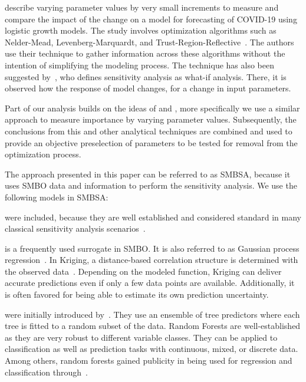 \documentclass[conference]{IEEEtran}
\renewenvironment{description}[0]{\begin{compactdesc}}{\end{compactdesc}}
\begin{document}
\citet{Ahmed20} describe varying parameter values by very small increments to measure and compare the impact of the change on a model for forecasting of COVID-19 using logistic growth models. The study involves optimization algorithms such as Nelder-Mead, Levenberg-Marquardt, and Trust-Region-Reflective~\citep{NelderM65}. The authors use their technique to gather information across these algorithms without the intention of simplifying the modeling process. 
The technique has also been suggested by~\citet{Kleijnen97}, who defines sensitivity analysis as what-if analysis.
There, it is observed how the response of model changes, for a change in input parameters. 

Part of our analysis builds on the ideas of \citet{Ahmed20} and \citet{Kleijnen97}, more specifically we use a similar approach to measure importance by varying parameter values. Subsequently, the conclusions from this and other analytical techniques are combined and used to provide an objective preselection of parameters to be tested for removal from the optimization process.

The approach presented in this paper can be referred to as \gls{SMBSA}, because it uses \gls{SMBO} data and information to perform the sensitivity analysis.
We use the following models in \gls{SMBSA}:
\begin{description}
\item[Linear regression models] were included, because they are well established and considered standard in many classical sensitivity analysis scenarios~\citep{Klei04e}.
\item[Kriging] is a frequently used surrogate in  \gls{SMBO}. It is also referred to as Gaussian process regression~\citep{Scho97a}.
In Kriging, a distance-based correlation structure is determined with the observed data~\citep{Forr08a}. 
Depending on the modeled function, Kriging can deliver accurate predictions even if only a few data points are available.
Additionally, it is often favored for being able to estimate its own prediction uncertainty. 
\item[Random Forests]  were initially introduced by~\citet{breiman2001random}.
They use an ensemble of tree predictors where each tree is fitted to a random subset of the data.
Random Forests are well-established as they are very robust to different variable classes.
They can be applied to classification as well as prediction tasks with continuous, mixed, or discrete data.
Among others, random forests gained publicity in being used for regression and classification through~\citet{liaw2002classification}. 
\end{description} 
\end{document}
